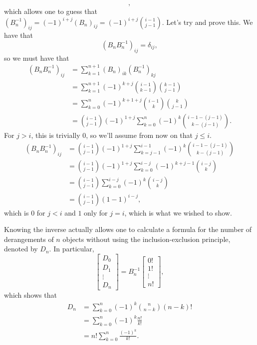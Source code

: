 \documentclass[a4paper, 12pt]{article}
\begin{document}
\begin{idea}
\[    ,\]
    which allows one to guess that \( (B_n^{-1})_{ij} = (-1)^{i + j} (B_n)_{ij} = (-1)^{i + j} \binom{i - 1}{j - 1} \). Let's try and prove this. We have that
    \[
        (B_n B_n^{-1})_{ij} = \delta_{ij}
    ,\]
    so we must have that
    \begin{align*}
        (B_n B_n^{-1})_{ij} &= \sum_{k = 1}^{n+1} (B_n)_{ik} (B_n^{-1})_{kj} \\
        &= \sum_{k = 1}^{n + 1} (-1)^{k + j} \binom{i - 1}{k - 1} \binom{k - 1}{j - 1} \\
        &= \sum_{k = 0}^{n} (-1)^{k + 1 + j} \binom{i - 1}{k} \binom{k}{j - 1}  \\
        &= \binom{i - 1}{j - 1} (-1)^{1 + j} \sum_{k = 0}^{n} (-1)^k \binom{i - 1 - (j - 1)}{k - (j - 1)} 
    .\end{align*}
    For \( j > i \), this is trivially \( 0 \), so we'll assume from now on that \( j \le i \).
    \begin{align*}
        (B_n B_n^{-1})_{ij}  &= \binom{i - 1}{j - 1} (-1)^{1 + j} \sum_{k = j - 1}^{i - 1} (-1)^k \binom{i - 1 - (j - 1)}{k - (j - 1)} \\
        &= \binom{i - 1}{j - 1} (-1)^{1 + j} \sum_{k = 0}^{i - j} (-1)^{k + j - 1} \binom{i - j}{k} \\
        &= \binom{i - 1}{j - 1} \sum_{k = 0}^{i - j} (-1)^k \binom{i - j}{k} \\
        &= \binom{i - 1}{j - 1} (1 - 1)^{i - j} 
    ,\end{align*}
    which is \( 0 \) for \( j < i \) and \( 1 \) only for \( j = i \), which is what we wished to show.
\end{idea}

\begin{remark}
    Knowing the inverse actually allows one to calculate a formula for the number of derangements of \( n \) objects without using the inclusion-exclusion principle, denoted by \( D_n \). In particular,
    \[
        \begin{bmatrix}
            D_0 \\
            D_1 \\
            \vdots \\
            D_{n}
        \end{bmatrix} =
        B_{n}^{-1} \begin{bmatrix}
            0! \\
            1! \\
            \vdots \\
            n!
        \end{bmatrix}
    ,\]
    which shows that
    \begin{align*}
        D_n &= \sum_{k = 0}^{n} (-1)^k \binom{n}{n - k} (n-k)! \\
        &= \sum_{k = 0}^{n} (-1)^k \frac{n!}{k!} \\
        &= n! \sum_{k = 0}^{n} \frac{(-1)^k}{k!}
    .\end{align*}
\end{remark}
\end{document}

